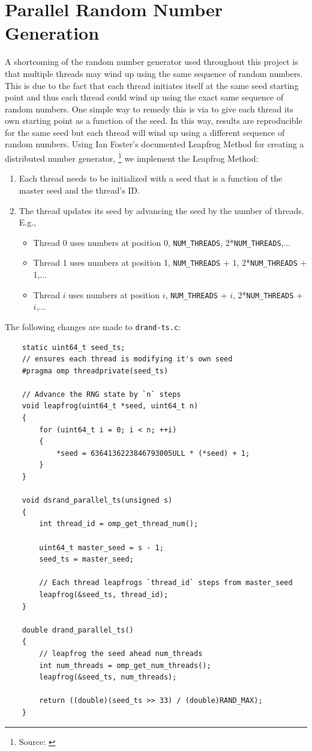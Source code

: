 \documentclass{article}
\newcommand{\MYhref}[3][blue]{\href{#2}{\color{#1}{#3}}}%
\begin{document}
\section{Parallel Random Number Generation}
A shortcoming of the random number generator used throughout this project is that multiple threads 
may wind up using the same sequence of random numbers. This is due to the fact that each thread initiates itself 
at the same seed starting point and thus each thread could wind up using the exact same sequence of random numbers. 
One simple way to remedy this is via to give each thread its own starting point as a function of the seed. In this way, 
results are reproducible for the same seed but each thread will wind up using a different sequence of random numbers. 
Using Ian Foster's documented Leapfrog Method for creating a distributed number generator,
\footnote{Source: \MYhref{https://www.mcs.anl.gov/\~itf/dbpp/text/node116.html}{https://www.mcs.anl.gov/~itf/dbpp/text/node116.html}}
we implement the Leapfrog Method:
\begin{enumerate}
    \item Each thread needs to be initialized with a seed that is a function of the master seed and the thread's ID.
    \item The thread updates its seed by advancing the seed by the number of threads. E.g.,
    \begin{itemize}
        \item Thread 0 uses numbers at position 0, \texttt{NUM\_THREADS}, 2*\texttt{NUM\_THREADS},...
        \item Thread 1 uses numbers at position 1, \texttt{NUM\_THREADS} + 1, 2*\texttt{NUM\_THREADS} + 1,...
        \item Thread $i$ uses numbers at position $i$, \texttt{NUM\_THREADS} + $i$, 2*\texttt{NUM\_THREADS} + $i$,...
    \end{itemize}
\end{enumerate}
The following changes are made to \texttt{drand-ts.c}:
\newpage
\begin{lstlisting}
    static uint64_t seed_ts;
    // ensures each thread is modifying it's own seed
    #pragma omp threadprivate(seed_ts)
    
    // Advance the RNG state by `n` steps
    void leapfrog(uint64_t *seed, uint64_t n)
    {
        for (uint64_t i = 0; i < n; ++i)
        {
            *seed = 6364136223846793005ULL * (*seed) + 1;
        }
    }
    
    void dsrand_parallel_ts(unsigned s)
    {
        int thread_id = omp_get_thread_num();
    
        uint64_t master_seed = s - 1;
        seed_ts = master_seed;
    
        // Each thread leapfrogs `thread_id` steps from master_seed
        leapfrog(&seed_ts, thread_id);
    }
    
    double drand_parallel_ts()
    {
        // leapfrog the seed ahead num_threads
        int num_threads = omp_get_num_threads();
        leapfrog(&seed_ts, num_threads);
    
        return ((double)(seed_ts >> 33) / (double)RAND_MAX);
    }
\end{lstlisting}
\end{document}

